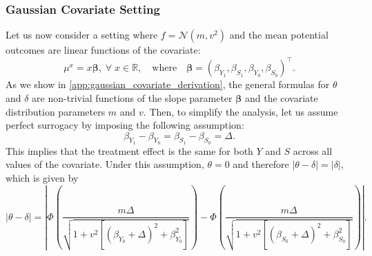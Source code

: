 \documentclass[referee,usenatbib]{biom}
\begin{document}

\subsubsection{Gaussian Covariate Setting}
\label{subsec:gaussian_covariate_setting}

Let us now consider a setting where \(f = \mathcal{N}(m,v^2)\) and the mean potential outcomes are linear functions of the covariate:
\begin{equation*}
    \mu^{x} = x \boldsymbol{\beta}, \; \forall \; x \in \mathbb{R}, \quad \text{where} \quad \boldsymbol{\beta} = (\beta_{Y_{1}}, \beta_{S_{1}}, \beta_{Y_{0}}, \beta_{S_{0}})^{\top}.
\end{equation*}
As we show in \ref{app:gaussian_covariate_derivation}, the general formulas for \(\theta\) and \(\delta\) are non-trivial functions of the slope parameter \(\boldsymbol{\beta}\) and the covariate distribution parameters \(m\) and \(v\). Then, to simplify the analysis, let us assume perfect surrogacy by imposing the following assumption:
\begin{equation}
\label{eq:perfect_surrogacy_assumption_gaussian_covariate}
    \beta_{Y_{1}} - \beta_{Y_{0}} = \beta_{S_{1}} - \beta_{S_{0}} = \Delta.
\end{equation}
This implies that the treatment effect is the same for both \(Y\) and \(S\) across all values of the covariate. Under this assumption, \(\theta = 0\) and therefore \(|\theta - \delta| = |\delta|\), which is given by
\begin{equation*}
    |\theta - \delta| = \left| \Phi \left( \frac{m \Delta}{\sqrt{1 + v^2 \left[ (\beta_{Y_{0}} + \Delta)^2 + \beta_{Y_{0}}^2 \right]}} \right) - \Phi \left( \frac{m \Delta}{\sqrt{1 + v^2 \left[ (\beta_{S_{0}} + \Delta)^2 + \beta_{S_{0}}^2 \right]}} \right) \right|.
\end{equation*}
\end{document}
